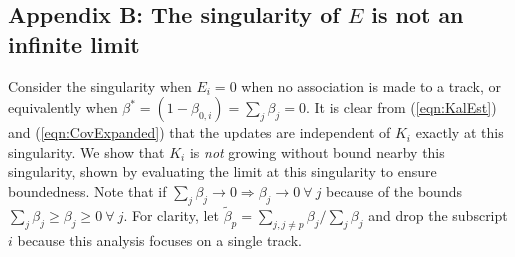 \documentclass[letterpaper, paper,10pt]{AAS}		%
\newcommand{\refeqn}[1]{(\ref{eqn:#1})}
\begin{document}
\begin{appendix}
\subsection{Appendix B: The singularity of $E$ is not an infinite limit}
Consider the singularity when $E_i=0$ when no association is made to a track, or equivalently when $\beta^*=(1-\beta_{0,i})=\sum\limits_{j}\beta_j=0$.
It is clear from \refeqn{KalEst} and \refeqn{CovExpanded} that the updates are independent of $K_i$ exactly at this singularity.
We show that $K_i$ is \emph{not} growing without bound nearby this singularity, shown by evaluating the limit at this singularity to ensure boundedness.
Note that if $\sum\limits_{j}\beta_j\rightarrow0\Rightarrow \beta_j\rightarrow0\ \forall\ j$ because of the bounds $\sum\limits_{j}\beta_j\geq\beta_j\geq0\ \forall \ j$.
For clarity, let $\tilde\beta_p=\sum\limits_{j,j\neq p}\beta_j/\sum\limits_{j}\beta_j$ and drop the subscript $i$ because this analysis focuses on a single track.


\end{appendix}
\end{document}
